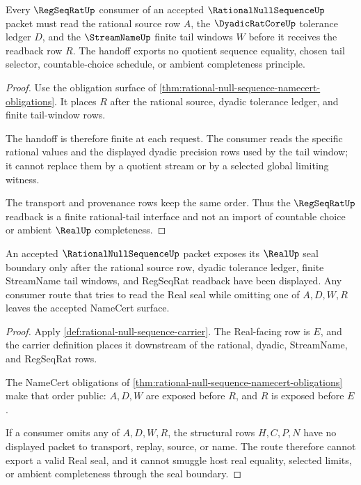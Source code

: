 \begin{theorem}
\label{thm:rational-null-sequence-regseqrat-handoff}
Every $\RegSeqRatUp$ consumer of an accepted $\RationalNullSequenceUp$ packet must read the rational source row $A$, the $\DyadicRatCoreUp$ tolerance ledger $D$, and the $\StreamNameUp$ finite tail windows $W$ before it receives the readback row $R$. The handoff exports no quotient sequence equality, chosen tail selector, countable-choice schedule, or ambient completeness principle.
\end{theorem}
\begin{proof}
Use the obligation surface of \autoref{thm:rational-null-sequence-namecert-obligations}. It places $R$ after the rational source, dyadic tolerance ledger, and finite tail-window rows.

The handoff is therefore finite at each request. The consumer reads the specific rational values and the displayed dyadic precision rows used by the tail window; it cannot replace them by a quotient stream or by a selected global limiting witness.

The transport and provenance rows keep the same order. Thus the $\RegSeqRatUp$ readback is a finite rational-tail interface and not an import of countable choice or ambient $\RealUp$ completeness.
\end{proof}

\begin{theorem}
\label{thm:rational-null-sequence-real-seal-nonescape}
An accepted $\RationalNullSequenceUp$ packet exposes its $\RealUp$ seal boundary only after the rational source row, dyadic tolerance ledger, finite StreamName tail windows, and RegSeqRat readback have been displayed. Any consumer route that tries to read the Real seal while omitting one of $A,D,W,R$ leaves the accepted NameCert surface.
\end{theorem}
\begin{proof}
Apply \autoref{def:rational-null-sequence-carrier}. The Real-facing row is $E$, and the carrier definition places it downstream of the rational, dyadic, StreamName, and RegSeqRat rows.

The NameCert obligations of \autoref{thm:rational-null-sequence-namecert-obligations} make that order public: $A,D,W$ are exposed before $R$, and $R$ is exposed before $E$.

If a consumer omits any of $A,D,W,R$, the structural rows $H,C,P,N$ have no displayed packet to transport, replay, source, or name. The route therefore cannot export a valid Real seal, and it cannot smuggle host real equality, selected limits, or ambient completeness through the seal boundary.
\end{proof}

